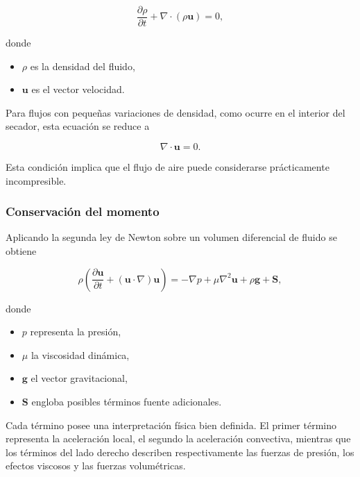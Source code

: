 \begin{equation}
\frac{\partial \rho}{\partial t}
+\nabla\cdot(\rho\mathbf{u})=0,
\label{eq:continuidad}
\end{equation}

donde

\begin{itemize}
\item $\rho$ es la densidad del fluido,
\item $\mathbf{u}$ es el vector velocidad.
\end{itemize}

Para flujos con pequeñas variaciones de densidad, como ocurre en el interior del secador, esta ecuación se reduce a

\begin{equation}
\nabla\cdot\mathbf{u}=0.
\end{equation}

Esta condición implica que el flujo de aire puede considerarse prácticamente incompresible.

\subsubsection{Conservación del momento}

Aplicando la segunda ley de Newton sobre un volumen diferencial de fluido se obtiene

\begin{equation}
\rho
\left(
\frac{\partial\mathbf{u}}{\partial t}
+
(\mathbf{u}\cdot\nabla)\mathbf{u}
\right)
=
-\nabla p
+\mu\nabla^2\mathbf{u}
+\rho\mathbf{g}
+\mathbf{S},
\label{eq:navierstokes}
\end{equation}

donde

\begin{itemize}

\item $p$ representa la presión,

\item $\mu$ la viscosidad dinámica,

\item $\mathbf{g}$ el vector gravitacional,

\item $\mathbf{S}$ engloba posibles términos fuente adicionales.
\end{itemize}

Cada término posee una interpretación física bien definida. El primer término representa la aceleración local, el segundo la aceleración convectiva, mientras que los términos del lado derecho describen respectivamente las fuerzas de presión, los efectos viscosos y las fuerzas volumétricas.

